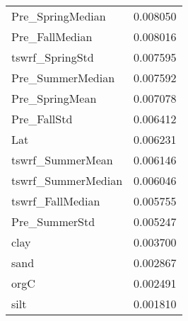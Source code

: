 \begin{tabular}{lr}
Pre_SpringMedian & 0.008050 \\
Pre_FallMedian & 0.008016 \\
tswrf_SpringStd & 0.007595 \\
Pre_SummerMedian & 0.007592 \\
Pre_SpringMean & 0.007078 \\
Pre_FallStd & 0.006412 \\
Lat & 0.006231 \\
tswrf_SummerMean & 0.006146 \\
tswrf_SummerMedian & 0.006046 \\
tswrf_FallMedian & 0.005755 \\
Pre_SummerStd & 0.005247 \\
clay & 0.003700 \\
sand & 0.002867 \\
orgC & 0.002491 \\
silt & 0.001810 \\
\bottomrule
\end{tabular}
